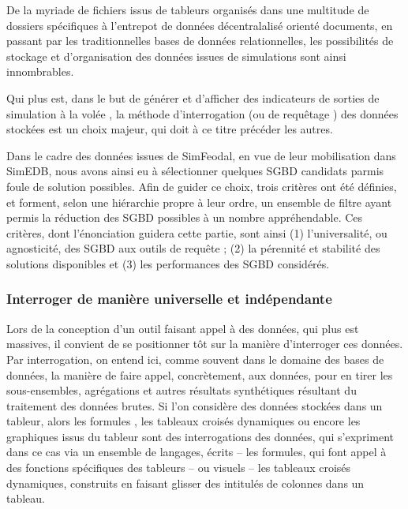 	De la myriade de fichiers issus de tableurs organisés dans une multitude de dossiers spécifiques à l'entrepot de données décentralalisé orienté documents, en passant par les traditionnelles bases de données relationnelles, les possibilités de stockage et d'organisation des données issues de simulations sont ainsi innombrables.

	Qui plus est, dans le but de générer et d'afficher des indicateurs de sorties de simulation \og à la volée \fg{}, la méthode d'interrogation (ou de \og requêtage \fg{}) des données stockées est un choix majeur, qui doit à ce titre précéder les autres.

	Dans le cadre des données issues de SimFeodal, en vue de leur mobilisation dans SimEDB, nous avons ainsi eu à sélectionner quelques SGBD candidats parmis foule de solution possibles.
	Afin de guider ce choix, trois critères ont été définies, et forment, selon une hiérarchie propre à leur ordre, un ensemble de filtre ayant permis la réduction des SGBD possibles à un nombre appréhendable.
	Ces critères, dont l'énonciation guidera cette partie, sont ainsi (1) l'universalité, ou \og agnosticité\fg{}, des SGBD aux outils de requête ; (2) la pérennité et stabilité des solutions disponibles et (3) les performances des SGBD considérés.

		\subsubsection{Interroger de manière universelle et indépendante}

		Lors de la conception d'un outil faisant appel à des données, qui plus est massives, il convient de se positionner tôt sur la manière d'interroger ces données.
		Par interrogation, on entend ici, comme souvent dans le domaine des bases de données, la manière de faire appel, concrètement, aux données, pour en tirer les sous-ensembles, agrégations et autres résultats synthétiques résultant du traitement des données brutes.
		Si l'on considère des données stockées dans un tableur, alors les \og formules \fg{}, les tableaux croisés dynamiques ou encore les graphiques issus du tableur sont des interrogations des données, qui s'expriment dans ce cas via un ensemble de langages, écrits -- les formules, qui font appel à des fonctions spécifiques des tableurs -- ou visuels -- les tableaux croisés dynamiques, construits en faisant glisser des intitulés de colonnes dans un tableau.

